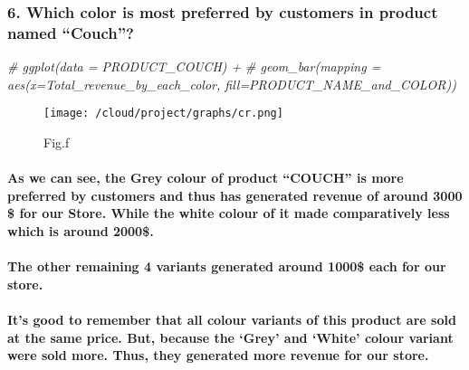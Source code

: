 \documentclass[
]{article}
\newenvironment{Shaded}{\begin{snugshade}}{\end{snugshade}}
\newcommand{\CommentTok}[1]{\textcolor[rgb]{0.56,0.35,0.01}{\textit{#1}}}
\begin{document}
\hypertarget{which-color-is-most-preferred-by-customers-in-product-named-couch-1}{%
\subsubsection{6. Which color is most preferred by customers in product
named
``Couch''?}\label{which-color-is-most-preferred-by-customers-in-product-named-couch-1}}

\begin{Shaded}
\begin{Highlighting}[]
\CommentTok{\# ggplot(data = PRODUCT\_COUCH) +}
\CommentTok{\#   geom\_bar(mapping = aes(x=Total\_revenue\_by\_each\_color, fill=PRODUCT\_NAME\_and\_COLOR))}
\end{Highlighting}
\end{Shaded}

\begin{figure}
\centering
\texttt{[image: /cloud/project/graphs/cr.png]}
\caption{Fig.f}
\end{figure}

\hypertarget{as-we-can-see-the-grey-colour-of-product-couch-is-more-preferred-by-customers-and-thus-has-generated-revenue-of-around-3000-for-our-store.-while-the-white-colour-of-it-made-comparatively-less-which-is-around-2000.}{%
\paragraph{As we can see, the Grey colour of product ``COUCH'' is more
preferred by customers and thus has generated revenue of around 3000 \$
for our Store. While the white colour of it made comparatively less
which is around
2000\$.}\label{as-we-can-see-the-grey-colour-of-product-couch-is-more-preferred-by-customers-and-thus-has-generated-revenue-of-around-3000-for-our-store.-while-the-white-colour-of-it-made-comparatively-less-which-is-around-2000.}}

\hypertarget{the-other-remaining-4-variants-generated-around-1000-each-for-our-store.}{%
\paragraph{The other remaining 4 variants generated around 1000\$ each
for our
store.}\label{the-other-remaining-4-variants-generated-around-1000-each-for-our-store.}}

\hypertarget{its-good-to-remember-that-all-colour-variants-of-this-product-are-sold-at-the-same-price.-but-because-the-grey-and-white-colour-variant-were-sold-more.-thus-they-generated-more-revenue-for-our-store.}{%
\paragraph{It's good to remember that all colour variants of this
product are sold at the same price. But, because the `Grey' and `White'
colour variant were sold more. Thus, they generated more revenue for our
store.}\label{its-good-to-remember-that-all-colour-variants-of-this-product-are-sold-at-the-same-price.-but-because-the-grey-and-white-colour-variant-were-sold-more.-thus-they-generated-more-revenue-for-our-store.}}
\end{document}
